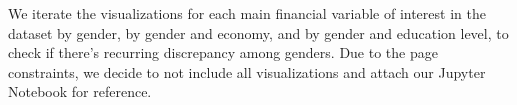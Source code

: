 \documentclass[12pt]{article}
\begin{document}
We iterate the visualizations for each main financial variable of
interest in the dataset by gender, by gender and economy, and by gender
and education level, to check if there's recurring discrepancy among
genders. Due to the page constraints, we decide to not include all
visualizations and attach our Jupyter Notebook for reference.



\end{document}

